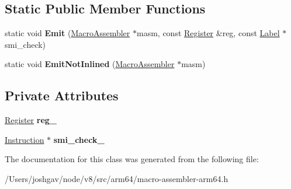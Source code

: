 \subsection*{Static Public Member Functions}
\begin{DoxyCompactItemize}
\item 
static void {\bfseries Emit} (\hyperlink{classv8_1_1internal_1_1_macro_assembler}{Macro\+Assembler} $\ast$masm, const \hyperlink{structv8_1_1internal_1_1_register}{Register} \&reg, const \hyperlink{classv8_1_1internal_1_1_label}{Label} $\ast$smi\+\_\+check)\hypertarget{classv8_1_1internal_1_1_inline_smi_check_info_aa1c356dd499384adb172a218e21e0ddf}{}\label{classv8_1_1internal_1_1_inline_smi_check_info_aa1c356dd499384adb172a218e21e0ddf}

\item 
static void {\bfseries Emit\+Not\+Inlined} (\hyperlink{classv8_1_1internal_1_1_macro_assembler}{Macro\+Assembler} $\ast$masm)\hypertarget{classv8_1_1internal_1_1_inline_smi_check_info_a7e57ca150986e9c24803687b1e1f4651}{}\label{classv8_1_1internal_1_1_inline_smi_check_info_a7e57ca150986e9c24803687b1e1f4651}

\end{DoxyCompactItemize}
\subsection*{Private Attributes}
\begin{DoxyCompactItemize}
\item 
\hyperlink{structv8_1_1internal_1_1_register}{Register} {\bfseries reg\+\_\+}\hypertarget{classv8_1_1internal_1_1_inline_smi_check_info_ad9cc9d91bb100e7d59f7e627b5cfc4b7}{}\label{classv8_1_1internal_1_1_inline_smi_check_info_ad9cc9d91bb100e7d59f7e627b5cfc4b7}

\item 
\hyperlink{classv8_1_1internal_1_1_instruction}{Instruction} $\ast$ {\bfseries smi\+\_\+check\+\_\+}\hypertarget{classv8_1_1internal_1_1_inline_smi_check_info_aa61678b883c85a793a7a7e2290de3234}{}\label{classv8_1_1internal_1_1_inline_smi_check_info_aa61678b883c85a793a7a7e2290de3234}

\end{DoxyCompactItemize}


The documentation for this class was generated from the following file\+:\begin{DoxyCompactItemize}
\item 
/\+Users/joshgav/node/v8/src/arm64/macro-\/assembler-\/arm64.\+h\end{DoxyCompactItemize}
